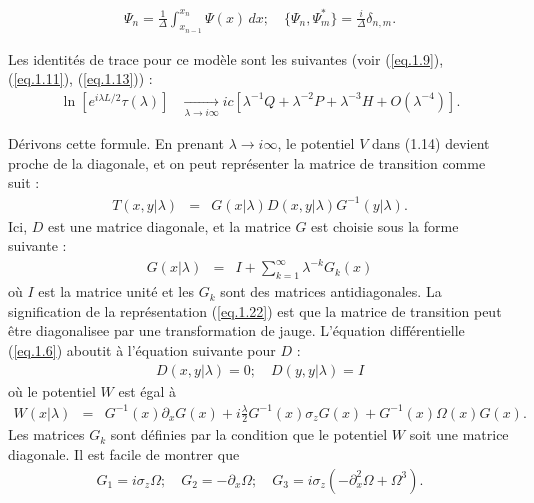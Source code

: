\begin{eqnarray}
	\Psi_n = \frac{1}{\Delta} \int_{x_{n-1}}^{x_n} \Psi (x) \, dx ; \quad \{ \Psi_n , \Psi_m^\ast \} = \frac{i}{\Delta} \delta_{n,m}.	
\end{eqnarray}

Les identités de trace pour ce modèle sont les suivantes (voir (\ref{eq.1.9}), (\ref{eq.1.11}), (\ref{eq.1.13})) :
\begin{eqnarray}
	\ln \left [ e^{i \lambda L/2} \tau ( \lambda) \right ]  & \underset{\lambda \to i \infty }{ \longrightarrow} i c \left [ \lambda^{-1} Q + \lambda^{-2} P + \lambda^{-3} H + O\left ( \lambda^{-4} \right )  \right ] .
\end{eqnarray}

Dérivons cette formule. En prenant \( \lambda \to i\infty \), le potentiel \( V \) dans (1.14) devient proche de la diagonale, et on peut représenter la matrice de transition comme suit :
\begin{eqnarray}
    T(x, y|\lambda) & = &  G(x|\lambda) D(x, y|\lambda) G^{-1}(y|\lambda). \label{eq.1.22}
\end{eqnarray}
Ici, \( D \) est une matrice diagonale, et la matrice \( G \) est choisie sous la forme suivante :
\begin{eqnarray}
    G(x|\lambda) & =  &I + \sum_{k=1}^\infty \lambda^{-k} G_k(x)
\end{eqnarray}
où \( I \) est la matrice unité et les \( G_k \) sont des matrices antidiagonales. La signification de la représentation (\ref{eq.1.22}) est que la matrice de transition peut être diagonalisee par une transformation de jauge. L'équation différentielle (\ref{eq.1.6}) aboutit à l'équation suivante pour \( D \) :
\begin{eqnarray}
    [\partial_x + W(x\vert \lambda] D(x, y|\lambda) = 0; \quad D(y, y\vert\lambda) = I
\end{eqnarray}
où le potentiel \( W \) est égal à
\begin{eqnarray}
    W(x \vert \lambda) & =  &G^{-1}(x) \partial_x G(x) + i \frac{\lambda}2  G^{-1}(x) \sigma_z G(x) + G^{-1}(x) \Omega(x) G(x).
\end{eqnarray}
Les matrices \( G_k \) sont définies par la condition que le potentiel \( W \) soit une matrice diagonale. Il est facile de montrer que
\begin{eqnarray}
	G_1 = i \sigma_z \Omega;\quad G_2= - \partial_x \Omega; \quad G_3=i\sigma_z ( - \partial_x^2 \Omega + \Omega^3).	
\end{eqnarray}

